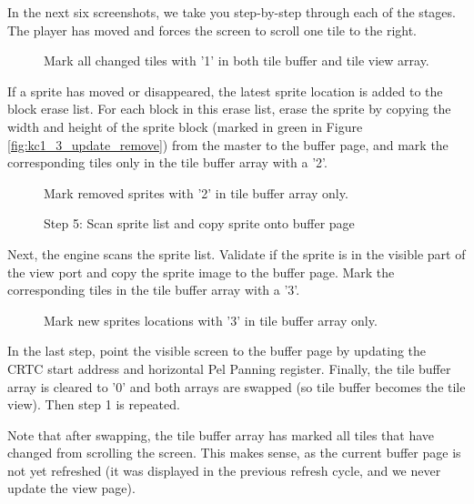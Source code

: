 \documentclass[book.tex]{subfiles}
\begin{document}
In the next six screenshots, we take you step-by-step through each of the stages. The player has moved and forces the screen to scroll one tile to the right. \\

\begin{figure}[H]
\centering
 \caption{Mark all changed tiles with '1' in both tile buffer and tile view array.}
 \label{fig:kc1_3_update_refresh_img_1}
\end{figure}


\par
If a sprite has moved or disappeared, the latest sprite location is added to the block erase list. For each block in this erase list, erase the sprite by copying the width and height of the sprite block (marked in green in Figure \ref{fig:kc1_3_update_remove}) from the master to the buffer page, and mark the corresponding tiles only in the tile buffer array with a '2'.

\begin{figure}[H]
\centering
 \caption{Mark removed sprites with '2' in tile buffer array only.}
 \label{fig:kc1_3_tile_update_remove}
\end{figure}


\pagebreak

\begin{figure}[H]
\centering
 \caption{Step 5: Scan sprite list and copy sprite onto buffer page}
 \label{fig:kc1_3_update_sprite}
\end{figure}

Next, the engine scans the sprite list. Validate if the sprite is in the visible part of the view port and copy the sprite image to the buffer page. Mark the corresponding tiles in the tile buffer array with a '3'.

\begin{figure}[H]
\centering
 \caption{Mark new sprites locations with '3' in tile buffer array only.}
 \label{fig:kc1_3_tile_update_sprite}
\end{figure}



In the last step, point the visible screen to the buffer page by updating the CRTC start address and horizontal Pel Panning register. Finally, the tile buffer array is cleared to '0' and both arrays are swapped (so tile buffer becomes the tile view). Then step 1 is repeated. \\
\par
Note that after swapping, the tile buffer array has marked all tiles that have changed from scrolling the screen. This makes sense, as the current buffer page is not yet refreshed (it was displayed in the previous refresh cycle, and we never update the view page). 
\end{document}
